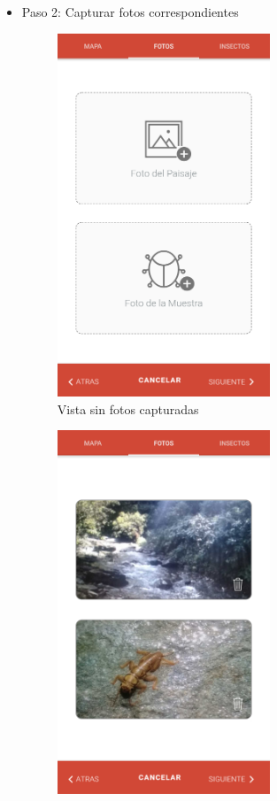 \begin{itemize}
\begin{itemize}
						\item Paso 2: Capturar fotos correspondientes
							\begin{figure}
								\centering
									\includegraphics[width=0.6\textwidth]{Screenshots/registroPaso2A.png}
											\caption{Vista sin fotos capturadas}
									\label{fig:registroPaso2A}
							\end{figure}
							\begin{figure}
								\centering
									\includegraphics[width=0.6\textwidth]{Screenshots/registroPaso2B.png}

\end{figure}
\end{itemize}
\end{itemize}
